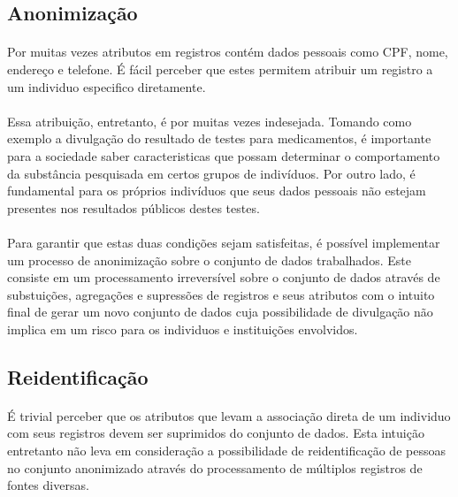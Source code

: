 \subsection{Anonimização}

\paragraph{} Por muitas vezes atributos em registros contém dados pessoais como CPF, nome, endereço e telefone. É fácil perceber que estes permitem atribuir um registro a um individuo especifico diretamente.

\paragraph{} Essa atribuição, entretanto, é por muitas vezes indesejada. Tomando como exemplo a divulgação do resultado de testes para medicamentos, é importante para a sociedade saber caracteristicas que possam determinar o comportamento da 
substância pesquisada em certos grupos de indivíduos. Por outro lado, é fundamental para os próprios indivíduos que seus dados pessoais não estejam presentes nos resultados públicos destes testes. 

\paragraph{} Para garantir que estas duas condições sejam satisfeitas, é possível implementar um processo de anonimização sobre o conjunto de dados trabalhados. Este consiste em um processamento irreversível\cite{dias2016multilingual} sobre o conjunto de dados através de substuições, agregações e supressões de registros e seus atributos com o intuito final de gerar um novo conjunto de dados cuja possibilidade de divulgação não implica em um risco para os individuos e instituições envolvidos. 

\subsection{Reidentificação}

\paragraph{} É trivial perceber que os atributos que levam a associação direta de um individuo com seus registros devem ser suprimidos do conjunto de dados. Esta intuição entretanto não leva em consideração a possibilidade de reidentificação de pessoas no conjunto anonimizado através do processamento de múltiplos registros de fontes diversas.

